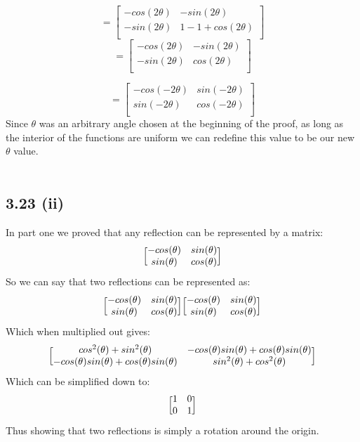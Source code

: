 \documentclass[letterpaper,12pt]{article}
\theoremstyle{definition}
\begin{document}
\[=
\begin{bmatrix}
    -cos(2\theta) & -sin(2\theta) \\
   -sin(2\theta) & 1-1+cos(2\theta) \\
 \end{bmatrix}\]
\[=
\begin{bmatrix}
    -cos(2\theta) & -sin(2\theta) \\
   -sin(2\theta) & cos(2\theta) \\
 \end{bmatrix}\]

 \[=
\begin{bmatrix}
    -cos(-2\theta) & sin(-2\theta) \\
   sin(-2\theta) & cos(-2\theta) \\
 \end{bmatrix}\]
Since $\theta$ was an arbitrary angle chosen at the beginning of the proof, as long as the interior of the functions are uniform we can redefine this value to be our new $\theta$ value.
\\ \\ 

\subsection*{3.23 (ii)}
In part one we proved that any reflection can be represented by a matrix:
\[\Big{[}\begin{matrix}
-cos(\theta) & sin(\theta)\\
sin(\theta) & cos(\theta)\\
\end{matrix} \Big{]}
\]
So we can say that two reflections can be represented as:
\[\Big{[}\begin{matrix}
-cos(\theta) & sin(\theta)\\
sin(\theta) & cos(\theta)\\
\end{matrix} \Big{]}
\Big{[}\begin{matrix}
-cos(\theta) & sin(\theta)\\
sin(\theta) & cos(\theta)\\
\end{matrix} \Big{]}\]
Which when multiplied out gives:
\[\Big{[}\begin{matrix}
cos^{2}(\theta)+sin^{2}(\theta) & -cos(\theta)sin(\theta) +cos(\theta)sin(\theta)  \\
-cos(\theta)sin(\theta) +cos(\theta)sin(\theta) & sin^{2}(\theta)+cos^{2}(\theta)  \\
\end{matrix} \Big{]}
\]
Which can be simplified down to:
\[\Big{[}\begin{matrix}
1 & 0\\
0 & 1\\
\end{matrix} \Big{]}
\]
Thus showing that two reflections is simply a rotation around the origin.\\
\\
\end{document}
